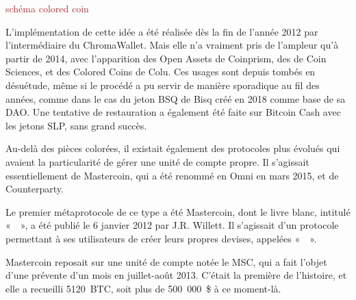 \textcolor{brown}{schéma colored coin}

L'implémentation de cette idée a été réalisée dès la fin de l'année 2012 par l'intermédiaire du ChromaWallet. Mais elle n'a vraiment pris de l'ampleur qu'à partir de 2014, avec l'apparition des Open Assets de Coinprism, des  de Coin Sciences, et des Colored Coins de Colu. Ces usages sont depuis tombés en désuétude, même si le procédé a pu servir de manière sporadique au fil des années, comme dans le cas du jeton BSQ de Bisq créé en 2018 comme base de sa DAO. Une tentative de restauration a également été faite sur Bitcoin Cash avec les jetons SLP, sans grand succès. %

Au-delà des pièces colorées, il existait également des protocoles plus évolués qui avaient la particularité de gérer une unité de compte propre. Il s'agissait essentiellement de Mastercoin, qui a été renommé en Omni en mars 2015, et de Counterparty.

Le premier métaprotocole de ce type a été Mastercoin, dont le livre blanc, intitulé «~~», a été publié le 6 janvier 2012 par J.R. Willett. Il s'agissait d'un protocole permettant à ses utilisateurs de créer leurs propres devises, appelées «~~».

Mastercoin reposait sur une unité de compte notée le MSC, qui a fait l'objet d'une prévente d'un mois en juillet-août 2013. C'était la première  de l'histoire, et elle a recueilli 5120~BTC, soit plus de 500~000~\$ à ce moment-là.

